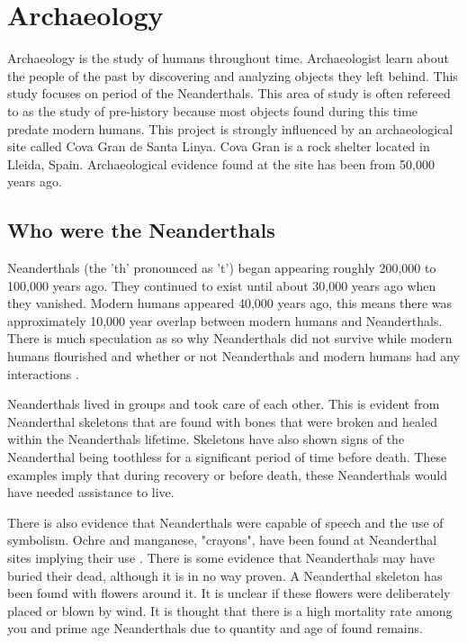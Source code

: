 \chapter{Archaeology}
Archaeology is the study of humans throughout time. Archaeologist learn about the people of the past by discovering and analyzing objects they left behind. This study focuses on period of the Neanderthals. This area of study is often refereed to as the study of pre-history because most objects found during this time predate modern humans. This project is strongly influenced by an archaeological site called Cova Gran de Santa Linya. Cova Gran is a rock shelter located in Lleida, Spain. Archaeological evidence found at the site has been from 50,000 years ago.    

\section{Who were the Neanderthals}
Neanderthals (the 'th' pronounced as 't') began appearing roughly 200,000 to 100,000 years ago. They continued to exist until about 30,000 years ago when they vanished. Modern humans appeared 40,000 years ago, this means there was approximately 10,000 year overlap between modern humans and Neanderthals. There is much speculation as so why Neanderthals did not survive while modern humans flourished and whether or not Neanderthals and modern humans had any interactions \cite{Smithsonian}.


Neanderthals lived in groups and took care of each other. This is evident from Neanderthal skeletons that are found with bones that were broken and healed within the Neanderthals lifetime. Skeletons have also shown signs of the Neanderthal being toothless for a significant period of time before death. These examples imply that during recovery or before death, these Neanderthals would have needed assistance to live. 


There is also evidence that Neanderthals were capable of speech and the use of symbolism. Ochre and manganese, "crayons", have been found at Neanderthal sites implying their use \cite{Harvati2010}. There is some evidence that Neanderthals may have buried their dead, although it is in no way proven. A Neanderthal skeleton has been found with flowers around it. It is unclear if these flowers were deliberately placed or blown by wind. It is thought that there is a high mortality rate among you and prime age Neanderthals due to quantity and age of found remains.    
 

